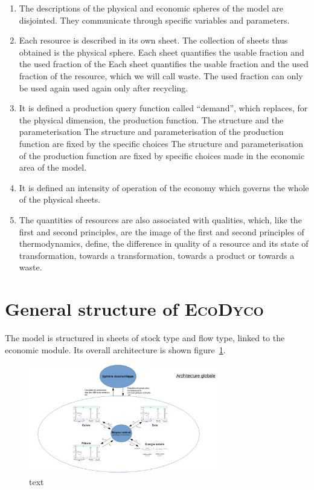 \documentclass[12pt,a4paper]{article}%
\newcommand{\ed}{\textsc{EcoDyco}}
\begin{document}
\begin{enumerate}
	\item The descriptions of the physical and economic spheres of the model
	are disjointed. They communicate through specific variables and parameters. 
	
	\item Each resource is described in its own sheet. The collection of sheets thus obtained is the physical sphere. Each sheet quantifies the usable fraction and the used fraction of the
	Each sheet quantifies the usable fraction and the used fraction of the resource, which we will call waste. The used fraction can only be used again
	used again only after recycling.
	
	\item It is defined a production query function called ``demand'', which
	replaces, for the physical dimension, the production function. The structure and the parameterisation 
	The structure and parameterisation of the production function are fixed by the specific choices
	The structure and parameterisation of the production function are fixed by specific choices made in the economic area of the model.
	
	\item It is defined an intensity of operation of the economy which governs
	the whole of the physical sheets.
	
	\item The quantities of resources are also associated with qualities, which, like the first and second principles, are
	the image of the first and second principles of thermodynamics, define,
	the difference in quality of a resource and its state of transformation, towards a
	transformation, towards a product or towards a waste.
\end{enumerate}


\section{General structure of \ed}

The model is structured in sheets of stock type and flow type,
linked to the economic module. Its overall architecture is shown figure~\ref{fig:globalstructure}.


\begin{figure}[h]
	\centering 
	\includegraphics[width=0.75\textwidth]{figures/Archiglobale.jpg}
	\caption{text}
	\label{fig:globalstructure}
\end{figure}
\end{document}
